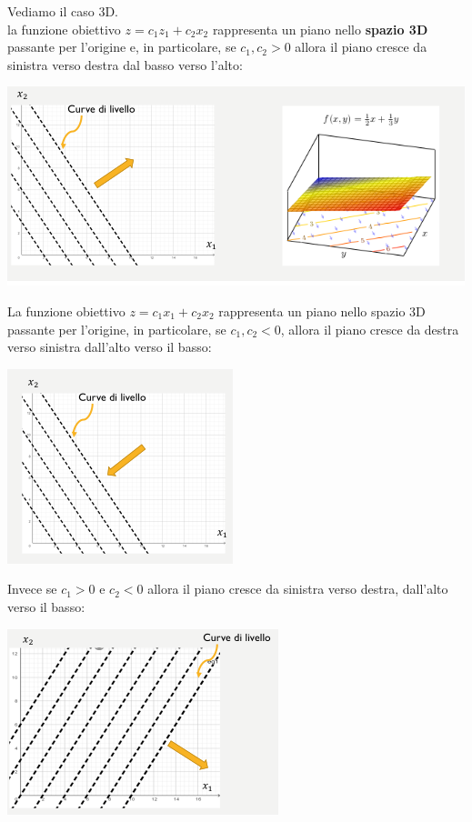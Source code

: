 \documentclass[a4paper,12pt, oneside]{book}
\begin{document}
Vediamo il caso 3D.\\
la funzione obiettivo $z=c_1z_1+c_2x_2$ rappresenta un piano nello
\textbf{spazio 3D} passante per l’origine e, in particolare, se
$c_1,c_2>0$ allora il piano cresce da sinistra verso destra dal basso
verso l’alto:
\begin{center}
  \includegraphics[scale = 0.7]{img/3d.png}
\end{center}
La funzione obiettivo $z=c_1x_1+c_2x_2$ rappresenta un piano nello
spazio 3D passante per l’origine, in particolare, se $c_1,c_2<0$,
allora il piano cresce da destra verso sinistra dall’alto verso il
basso:
\begin{center}
  \includegraphics[scale = 0.7]{img/3d2.png}
\end{center}
Invece se $c_1>0$ e $c_2<0$ allora il piano cresce da sinistra verso
destra, dall’alto verso il basso:
\begin{center}
  \includegraphics[scale = 0.7]{img/3d3.png}
\end{center}
\end{document}
